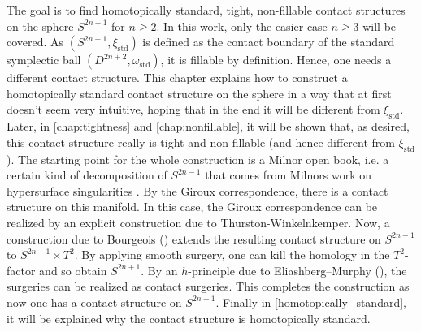 The goal is to find homotopically standard, tight, non-fillable contact structures on the sphere $S^{2n+1}$ for $n \geq 2$.
In this work, only the easier case $n \geq 3$ will be covered.
As $(S^{2n+1}, \xi_\mathrm{std})$ is defined as the contact boundary of the standard symplectic ball $(D^{2n+2}, \omega_\mathrm{std})$,
it is fillable by definition.
Hence, one needs a different contact structure.
This chapter explains how to construct a homotopically standard contact structure on the sphere in a way that at first doesn't seem very intuitive,
hoping that in the end it will be different from $\xi_\mathrm{std}$.
Later, in \cref{chap:tightness} and \cref{chap:nonfillable}, it will be shown that, as desired, this contact structure really is tight and non-fillable 
(and hence different from $\xi_\mathrm{std}$).
The starting point for the whole construction is a Milnor open book, i.e. a certain kind of decomposition of $S^{2n-1}$ that comes from
Milnors work on hypersurface singularities \cite{Milnor69}.
By the Giroux correspondence, there is a contact structure on this manifold.
In this case, the Giroux correspondence can be realized by an explicit construction due to Thurston-Winkelnkemper.
Now, a construction due to Bourgeois (\cite{Bourgeois02}) extends the resulting contact structure on $S^{2n-1}$ to $S^{2n-1}\times T^2$.
By applying smooth surgery, one can kill the homology in the $T^2$-factor and so obtain $S^{2n+1}$.
By an $h$-principle due to Eliashberg--Murphy (\cite[section 12.4]{EM02}), the surgeries can be realized as contact surgeries.
This completes the construction as now one has a contact structure on $S^{2n+1}$.
Finally in \cref{homotopically_standard}, it will be explained why the contact structure is homotopically standard.